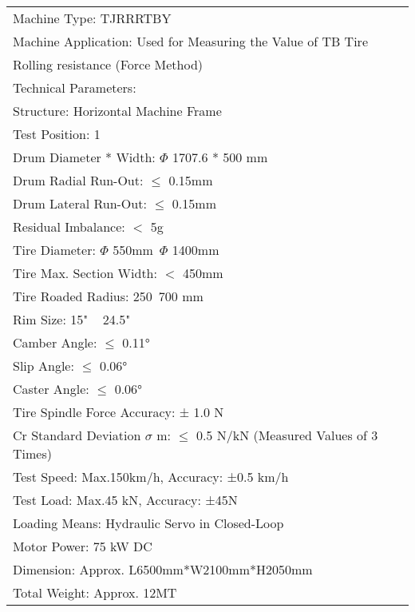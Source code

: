 \documentclass[varwidth=\maxdimen]{standalone}
\begin{document}
\begin{tabular}{ ||l|| }
	\toprule
	Machine Type: TJRRRTBY \\
	Machine Application: Used for Measuring the Value of  TB Tire\\ \tab  Rolling resistance (Force Method) \\
	Technical Parameters: \\
	Structure: Horizontal Machine Frame \\
	Test Position: 1 \\
	Drum Diameter * Width: $\Phi$ 1707.6 * 500 mm \\
	Drum Radial Run-Out: $\leq$ 0.15mm \\
	Drum Lateral Run-Out: $\leq$ 0.15mm \\
	Residual Imbalance: $<$ 5g \\
	Tire Diameter: $\Phi$ 550mm~$\Phi$ 1400mm \\
	Tire Max. Section Width: $<$ 450mm \\
	Tire Roaded Radius: 250~700 mm \\
	Rim Size: 15" ~ 24.5" \\
	Camber Angle: $\leq$ 0.11° \\
	Slip Angle: $\leq$ 0.06° \\
	Caster Angle: $\leq$ 0.06° \\
	Tire Spindle Force Accuracy: ± 1.0 N \\
	Cr Standard Deviation $\sigma$ m: $\leq $ 0.5 N/kN (Measured Values of 3 Times) \\
	Test Speed: Max.150km/h, Accuracy: ±0.5 km/h \\
	Test Load: Max.45 kN, Accuracy: ±45N \\
	Loading Means: Hydraulic Servo in Closed-Loop \\
	Motor Power: 75 kW DC \\
	Dimension: Approx. L6500mm*W2100mm*H2050mm \\
	Total Weight: Approx. 12MT \\
	\bottomrule
\end{tabular}
\end{document}
